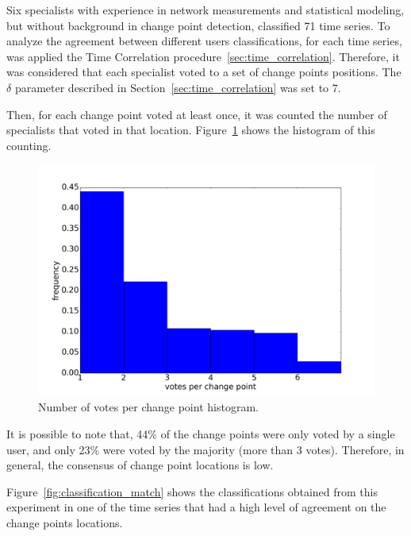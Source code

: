 Six specialists with experience in network measurements and statistical
modeling, but without background in change point detection, classified 71 time
series.
To analyze the agreement between different users classifications,
for each time series, was applied the Time Correlation
procedure~\ref{sec:time_correlation}. Therefore, it was
considered that each specialist voted to a set of change points positions.
The $\delta$ parameter described in Section~\ref{sec:time_correlation} was
set to 7.

Then, for each change point voted at least once, it was counted the number of
specialists that voted in that location.
Figure~\ref{fig:classifications_per_vote} shows the histogram of this counting.

\begin{figure}[H]
    \centering
    \includegraphics[width=0.7\linewidth]{./figures/methodology/supervised_learning_try/cnt_classifications_per_vote.png}
    \caption{Number of votes per change point histogram.}
\label{fig:classifications_per_vote}
\end{figure}%

It is possible to note that, 44\% of the change points were only voted by
a single user, and only 23\% were voted by the majority (more than 3 votes).
Therefore, in general, the consensus of change point locations is low.

Figure~\ref{fig:classification_match} shows the
classifications obtained from this experiment
in one of the time series that had a high level of agreement on the change
points locations.

